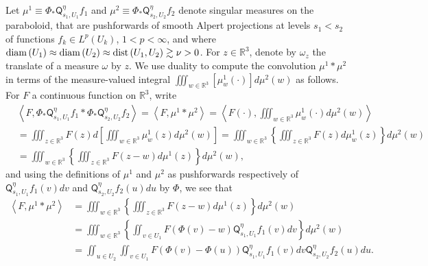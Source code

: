 \documentclass{amsart}%
\theoremstyle{plain}
\numberwithin{equation}{section}
\begin{document}
Let $\mu^{1}\equiv\Phi_{\ast}\mathsf{Q}_{s_{1},U_{1}}^{\eta}f_{1}$ and
$\mu^{2}\equiv\Phi_{\ast}\mathsf{Q}_{s_{2},U_{2}}^{\eta}f_{2}$ denote singular
measures on the paraboloid, that are pushforwards of smooth Alpert projections
at levels $s_{1}<s_{2}$ of functions $f_{k}\in L^{p}\left(  U_{k}\right)  $,
$1<p<\infty$, and where $\mathop{\rm diam}\left(  U_{1}\right)  \approx
\mathop{\rm diam}\left(  U_{2}\right)  \approx\mathop{\rm
dist}\left(  U_{1},U_{2}\right)  \gtrsim\nu>0$. For $z\in\mathbb{R}^{3}$,
denote by $\omega_{z}$ the translate of a measure $\omega$ by $z$. We use
duality to compute the convolution $\mu^{1}\ast\mu^{2}$ in terms of the
measure-valued integral $\iiint_{w\in\mathbb{R}^{3}}\left[  \mu_{w}^{1}\left(
\cdot\right)  \right]  d\mu^{2}\left(  w\right)  $ as follows. For $F$ a
continuous function on $\mathbb{R}^{3}$, write
\begin{align*}
&  \left\langle F,\Phi_{\ast}\mathsf{Q}_{s_{1},U_{1}}^{\eta}f_{1}\ast
\Phi_{\ast}\mathsf{Q}_{s_{2},U_{2}}^{\eta}f_{2}\right\rangle =\left\langle
F,\mu^{1}\ast\mu^{2}\right\rangle =\left\langle F\left(  \cdot\right)
,\iiint_{w\in\mathbb{R}^{3}}\mu_{w}^{1}\left(  \cdot\right)  d\mu^{2}\left(
w\right)  \right\rangle \\
&  =\iiint_{z\in\mathbb{R}^{3}}F\left(  z\right)  d\left[  \iiint
_{w\in\mathbb{R}^{3}}\mu_{w}^{1}\left(  z\right)  d\mu^{2}\left(  w\right)
\right]  =\iiint_{w\in\mathbb{R}^{3}}\left\{  \iiint_{z\in\mathbb{R}^{3}%
}F\left(  z\right)  d\mu_{w}^{1}\left(  z\right)  \right\}  d\mu^{2}\left(
w\right) \\
&  =\iiint_{w\in\mathbb{R}^{3}}\left\{  \iiint_{z\in\mathbb{R}^{3}}F\left(
z-w\right)  d\mu^{1}\left(  z\right)  \right\}  d\mu^{2}\left(  w\right)  ,
\end{align*}
and using the definitions of $\mu^{1}$ and $\mu^{2}$ as pushforwards
respectively of $\mathsf{Q}_{s_{1},U_{1}}^{\eta}f_{1}\left(  v\right)  dv$ and
$\mathsf{Q}_{s_{2},U_{2}}^{\eta}f_{2}\left(  u\right)  du$ by $\Phi$, we see
that%
\begin{align*}
\left\langle F,\mu^{1}\ast\mu^{2}\right\rangle  &  =\iiint_{w\in\mathbb{R}%
^{3}}\left\{  \iiint_{z\in\mathbb{R}^{3}}F\left(  z-w\right)  d\mu^{1}\left(
z\right)  \right\}  d\mu^{2}\left(  w\right) \\
&  =\iiint_{w\in\mathbb{R}^{3}}\left\{  \iint_{v\in U_{1}}F\left(  \Phi\left(
v\right)  -w\right)  \mathsf{Q}_{s_{1},U_{1}}^{\eta}f_{1}\left(  v\right)
dv\right\}  d\mu^{2}\left(  w\right) \\
&  =\iint_{u\in U_{2}}\iint_{v\in U_{1}}F\left(  \Phi\left(  v\right)
-\Phi\left(  u\right)  \right)  \mathsf{Q}_{s_{1},U_{1}}^{\eta}f_{1}\left(
v\right)  dv\mathsf{Q}_{s_{2},U_{2}}^{\eta}f_{2}\left(  u\right)  du.
\end{align*}
\end{document}
